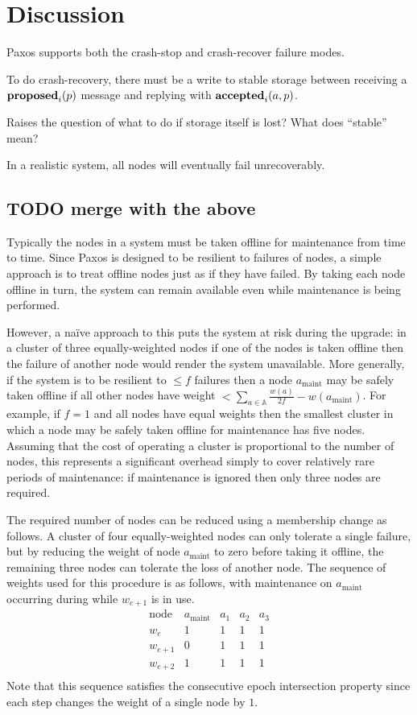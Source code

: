\documentclass[journal]{IEEEtran}
\begin{document}
\section{Discussion}\label{discussion}

Paxos supports both the crash-stop and crash-recover failure modes.

To do crash-recovery, there must be a write to stable storage between
receiving a $\mathbf{proposed}_{i}(p)$ message and replying with $\mathbf{accepted}_{i}(a,p)$.

Raises the question of what to do if storage itself is lost? What does
``stable'' mean?

In a realistic system, all nodes will eventually fail unrecoverably.





\subsection{TODO merge with the above}

Typically the nodes in a system must be taken offline for maintenance from time
to time. Since Paxos is designed to be resilient to failures of nodes, a simple
approach is to treat offline nodes just as if they have failed. By taking each
node offline in turn, the system can remain available even while maintenance is
being performed.

However, a na\"ive approach to this puts the system at risk during the upgrade:
in a cluster of three equally-weighted nodes if one of the nodes is taken
offline then the failure of another node would render the system unavailable.
More generally, if the system is to be resilient to $\le f$ failures then a
node $a_{\textrm{maint}}$ may be safely taken offline if all other nodes have
weight $< \sum_{a \in \mathbb A} \frac{w(a)}{2f} - w(a_{\textrm{maint}})$. For
example, if $f = 1$ and all nodes have equal weights then the smallest cluster
in which a node may be safely taken offline for maintenance has five nodes.
Assuming that the cost of operating a cluster is proportional to the number of
nodes, this represents a significant overhead simply to cover relatively rare
periods of maintenance: if maintenance is ignored then only three nodes are
required.

The required number of nodes can be reduced using a membership change as
follows. A cluster of four equally-weighted nodes can only tolerate a single
failure, but by reducing the weight of node $a_{\textrm{maint}}$ to zero before
taking it offline, the remaining three nodes can tolerate the loss of another
node. The sequence of weights used for this procedure is as follows, with
maintenance on $a_{\textrm{maint}}$ occurring during while $w_{e+1}$ is in use.
\[\begin{array}{rcccc}
\textrm{node}&a_{\textrm{maint}}&a_1&a_2&a_3 \\
w_e&1&1&1&1\\
w_{e+1}&0&1&1&1\\
w_{e+2}&1&1&1&1\\
\end{array}\]
Note that this sequence satisfies the consecutive epoch intersection property
since each step changes the weight of a single node by $1$.
\end{document}
